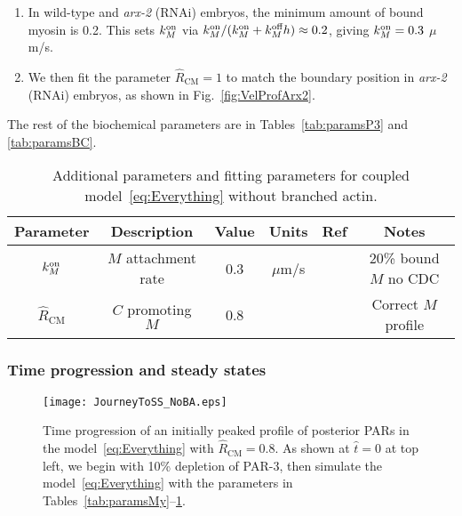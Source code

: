 \documentclass[11pt]{article}
\newcommand{\6}[1]{#1_{\text{6}}}
\newcommand{\3}[1]{#1_{\text{3}}}
\begin{document}
\begin{enumerate}
\item In wild-type and \emph{arx-2} (RNAi) embryos, the minimum amount of bound myosin is 0.2. This sets $k^\text{on}_M$ via $k^\text{on}_M/(k^\text{on}_M+k^\text{off}_M h) \approx 0.2$, giving $k^\text{on}_M=0.3$ $\mu$m/s.
\item We then fit the parameter $\hat R_\text{CM}=1$ to match the boundary position in \emph{arx-2} (RNAi) embryos, as shown in Fig.\ \ref{fig:VelProfArx2}.
\end{enumerate}
The rest of the biochemical parameters are in Tables\ \ref{tab:paramsP3} and \ref{tab:paramsBC}.

\begin{table}
\begin{small}
\centering
\begin{tabular}{|c|c|c|c|c|c|}\hline
Parameter & Description & Value & Units & Ref & Notes \\ \hline
$k^\text{on}_M$ & $M$ attachment rate & 0.3 & $\mu$m/s & & 20\% bound $M$ no CDC \\
$\hat R_\text{CM}$ & $C$ promoting $M$ & 0.8 & &  & Correct $M$ profile\\ \hline
\end{tabular}
\caption{\label{tab:paramsC} Additional parameters and fitting parameters for coupled model\ \eqref{eq:Everything} without branched actin.}
\end{small}
\end{table}


\subsubsection{Time progression and steady states}

\begin{figure}
\centering
\texttt{[image: JourneyToSS\_NoBA.eps]}
\caption{\label{fig:TimeSeqNoBA} Time progression of an initially peaked profile of posterior PARs in the model\ \eqref{eq:Everything} with $\hat R_\text{CM}=0.8$. As shown at $\hat t=0$ at top left, we begin with 10\% depletion of PAR-3, then simulate the model\ \eqref{eq:Everything} with the parameters in Tables\ \ref{tab:paramsMy}--\ref{tab:paramsC}.}
\end{figure}
\end{document}
